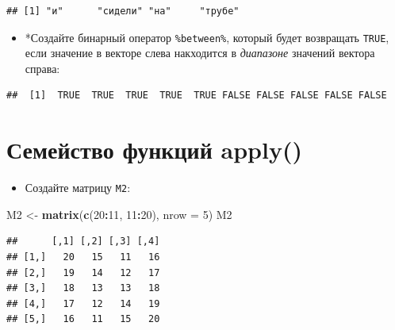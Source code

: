 \documentclass[]{book}
\newenvironment{Shaded}{\begin{snugshade}}{\end{snugshade}}
\newcommand{\KeywordTok}[1]{\textcolor[rgb]{0.13,0.29,0.53}{\textbf{#1}}}
\newcommand{\DataTypeTok}[1]{\textcolor[rgb]{0.13,0.29,0.53}{#1}}
\newcommand{\DecValTok}[1]{\textcolor[rgb]{0.00,0.00,0.81}{#1}}
\newcommand{\StringTok}[1]{\textcolor[rgb]{0.31,0.60,0.02}{#1}}
\newcommand{\OperatorTok}[1]{\textcolor[rgb]{0.81,0.36,0.00}{\textbf{#1}}}
\newcommand{\NormalTok}[1]{#1}
\providecommand{\tightlist}{%
  \setlength{\itemsep}{0pt}\setlength{\parskip}{0pt}}
\begin{document}
\begin{verbatim}
## [1] "и"      "сидели" "на"     "трубе"
\end{verbatim}

\begin{itemize}
\tightlist
\item
  *Создайте бинарный оператор \texttt{\%between\%}, который будет
  возвращать \texttt{TRUE}, если значение в векторе слева накходится в
  \emph{диапазоне} значений вектора справа:
\end{itemize}

\begin{Shaded}
\end{Shaded}

\begin{verbatim}
##  [1]  TRUE  TRUE  TRUE  TRUE  TRUE FALSE FALSE FALSE FALSE FALSE
\end{verbatim}

\section{Семейство функций apply()}\label{task_apply}

\begin{itemize}
\tightlist
\item
  Создайте матрицу \texttt{M2}:
\end{itemize}

\begin{Shaded}
\begin{Highlighting}[]
\NormalTok{M2 <-}\StringTok{ }\KeywordTok{matrix}\NormalTok{(}\KeywordTok{c}\NormalTok{(}\DecValTok{20}\OperatorTok{:}\DecValTok{11}\NormalTok{, }\DecValTok{11}\OperatorTok{:}\DecValTok{20}\NormalTok{), }\DataTypeTok{nrow =} \DecValTok{5}\NormalTok{)}
\NormalTok{M2}
\end{Highlighting}
\end{Shaded}

\begin{verbatim}
##      [,1] [,2] [,3] [,4]
## [1,]   20   15   11   16
## [2,]   19   14   12   17
## [3,]   18   13   13   18
## [4,]   17   12   14   19
## [5,]   16   11   15   20
\end{verbatim}
\end{document}
